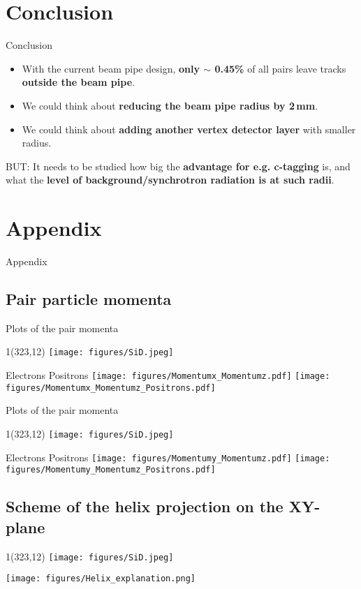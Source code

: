 \documentclass[xcolor={dvipsnames}]{beamer}
\newcommand{\sidlogo}{
  \setlength{\TPHorizModule}{1pt}
  \setlength{\TPVertModule}{1pt}
  \begin{textblock}{1}(323,12)
   \texttt{[image: figures/SiD.jpeg]}
  \end{textblock}
  }
\begin{document}
\section{Conclusion}
\begin{frame}{Conclusion}
\begin{itemize}
 \item With the current beam pipe design, \textbf{only $\sim$ 0.45\%} of all pairs leave tracks \textbf{outside the beam pipe}.
 \item We could think about \textbf{reducing the beam pipe radius by 2\,mm}.
 \item We could think about \textbf{adding another vertex detector layer} with smaller radius.
\end{itemize}
BUT:
It needs to be studied how big the \textbf{advantage for e.g. c-tagging} is,
and what the \textbf{level of background/synchrotron radiation is at such radii}.
 
\end{frame}

\section*{Appendix}
\begin{frame}
 \begin{center}
  Appendix
 \end{center}
\end{frame}

\subsection*{Pair particle momenta}
\begin{frame}{Plots of the pair momenta}
\sidlogo
 \begin{center}
 \hspace*{0.5cm} Electrons \hspace*{4.5cm} Positrons
\texttt{[image: figures/Momentumx\_Momentumz.pdf]}
\texttt{[image: figures/Momentumx\_Momentumz\_Positrons.pdf]}
\end{center}
\end{frame}
\begin{frame}{Plots of the pair momenta}
\sidlogo
 \begin{center}
 \hspace*{0.5cm} Electrons \hspace*{4.5cm} Positrons
\texttt{[image: figures/Momentumy\_Momentumz.pdf]}
\texttt{[image: figures/Momentumy\_Momentumz\_Positrons.pdf]}
\end{center}
\end{frame}
\subsection*{Scheme of the helix projection on the XY-plane}
\begin{frame}
\sidlogo
 \begin{center}
\texttt{[image: figures/Helix\_explanation.png]}
\end{center}
\end{frame}
\end{document}
